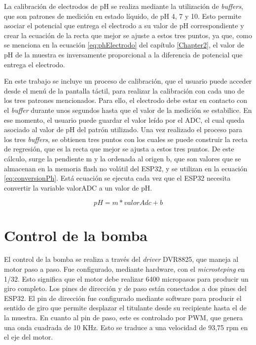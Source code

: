 La calibración de electrodos de pH se realiza mediante la utilización de \textit{buffers}, que son patrones de medición en estado líquido, de pH 4, 7 y 10. Esto permite asociar el potencial que entrega el electrodo a su valor de pH correspondiente y crear la ecuación de la recta que mejor se ajuste a estos tres puntos, ya que, como se menciona en la ecuación \ref{eq:phElectrodo} del capítulo \ref{Chapter2}, el valor de pH de la muestra es inversamente proporcional a la diferencia de potencial que entrega el electrodo.

En este trabajo se incluye un proceso de calibración, que el usuario puede acceder desde el menú de la pantalla táctil, para realizar la calibración con cada uno de los tres patrones mencionados. Para ello, el electrodo debe estar en contacto con el \textit{buffer} durante unos segundos hasta que el valor de la medición se estabilice. En ese momento, el usuario puede guardar el valor leído por el ADC, el cual queda asociado al valor de pH del patrón utilizado. Una vez realizado el proceso para los tres \textit{buffers}, se obtienen tres puntos con los cuales se puede construir la recta de regresión, que es la recta que mejor se ajusta a estos tres puntos. De este cálculo, surge la pendiente m y la ordenada al origen b, que son valores que se almacenan en la memoria flash no volátil del ESP32, y se utilizan en la ecuación \ref{eq:conversionPh}. Está ecuación se ejecuta cada vez que el ESP32 necesita convertir la variable valorADC a un valor de pH.

\begin{equation}
	\label{eq:conversionPh}
pH = m * valorAdc + b
\end{equation}


\section{Control de la bomba}

El control de la bomba se realiza a través del \textit{driver} DVR8825, que maneja al motor paso a paso. Fue configurado, mediante hardware, con el \textit{microsteping} en 1/32. Esto significa que el motor debe realizar 6400 micropasos para producir un giro completo. Los pines de dirección y de paso están conectados a dos pines del ESP32. El pin de dirección fue configurado mediante software para producir el sentido de giro que permite desplazar el titulante desde su recipiente hasta el de la muestra. En cuanto al pin de paso, este es controlado por PWM, que genera una onda cuadrada de 10 KHz. Esto se traduce a una velocidad de 93,75 rpm en el eje del motor.


